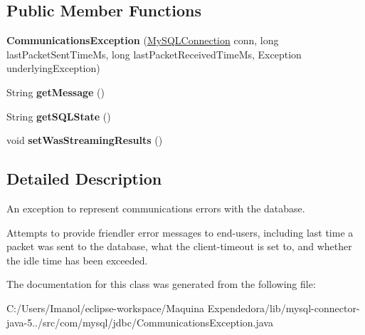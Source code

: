 \subsection*{Public Member Functions}
\begin{DoxyCompactItemize}
\item 
\mbox{\label{classcom_1_1mysql_1_1jdbc_1_1_communications_exception_a319f62e9eef2b77aa26040325345872a}} 
{\bfseries Communications\+Exception} (\mbox{\hyperlink{interfacecom_1_1mysql_1_1jdbc_1_1_my_s_q_l_connection}{My\+S\+Q\+L\+Connection}} conn, long last\+Packet\+Sent\+Time\+Ms, long last\+Packet\+Received\+Time\+Ms, Exception underlying\+Exception)
\item 
\mbox{\label{classcom_1_1mysql_1_1jdbc_1_1_communications_exception_a8f6bb2b23bc3d77ab7a7e8215101ccc0}} 
String {\bfseries get\+Message} ()
\item 
\mbox{\label{classcom_1_1mysql_1_1jdbc_1_1_communications_exception_a9ac577006f6321086d4d8238fd5eca48}} 
String {\bfseries get\+S\+Q\+L\+State} ()
\item 
\mbox{\label{classcom_1_1mysql_1_1jdbc_1_1_communications_exception_af4d14af816b455f70f0878e1c1273197}} 
void {\bfseries set\+Was\+Streaming\+Results} ()
\end{DoxyCompactItemize}


\subsection{Detailed Description}
An exception to represent communications errors with the database.

Attempts to provide \textquotesingle{}friendler\textquotesingle{} error messages to end-\/users, including last time a packet was sent to the database, what the client-\/timeout is set to, and whether the idle time has been exceeded. 

The documentation for this class was generated from the following file\+:\begin{DoxyCompactItemize}
\item 
C\+:/\+Users/\+Imanol/eclipse-\/workspace/\+Maquina Expendedora/lib/mysql-\/connector-\/java-\/5../src/com/mysql/jdbc/Communications\+Exception.\+java\end{DoxyCompactItemize}
